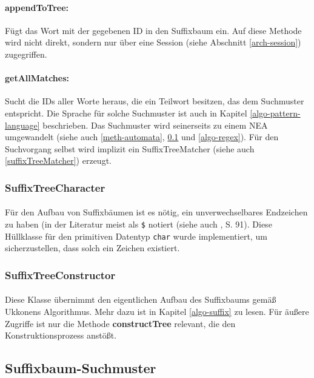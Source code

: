 \paragraph{appendToTree:} Fügt das Wort mit der gegebenen ID in den Suffixbaum ein. Auf diese Methode wird nicht direkt, sondern nur über eine Session (siehe Abschnitt \ref{arch-session}) zugegriffen.

\paragraph{getAllMatches:} Sucht die IDs aller Worte heraus, die ein Teilwort besitzen, das dem Suchmuster entspricht. Die Sprache für solche Suchmuster ist auch in Kapitel \ref{algo-pattern-language} beschrieben. Das Suchmuster wird seinerseits zu einem NEA umgewandelt (siehe auch \ref{meth-automata}, \ref{arch-pattern} und \ref{algo-regex}). Für den Suchvorgang selbst wird implizit ein SuffixTreeMatcher (siehe auch \ref{suffixTreeMatcher}) erzeugt.

\subsubsection{SuffixTreeCharacter}

\paragraph{} Für den Aufbau von Suffixbäumen ist es nötig, ein unverwechselbares Endzeichen zu haben (in der Literatur meist als \texttt{\$} notiert (siehe auch \cite{gusfield}, S. 91). Diese Hüllklasse für den primitiven Datentyp \texttt{char} wurde implementiert, um sicherzustellen, dass solch ein Zeichen existiert.

\subsubsection{SuffixTreeConstructor}

\paragraph{} Diese Klasse übernimmt den eigentlichen Aufbau des Suffixbaums gemäß Ukkonens Algorithmus. Mehr dazu ist in Kapitel \ref{algo-suffix} zu lesen. Für äußere Zugriffe ist nur die Methode \textbf{constructTree} relevant, die den Konstruktionsprozess anstößt.

\subsection{Suffixbaum-Suchmuster}
\label{arch-pattern}

